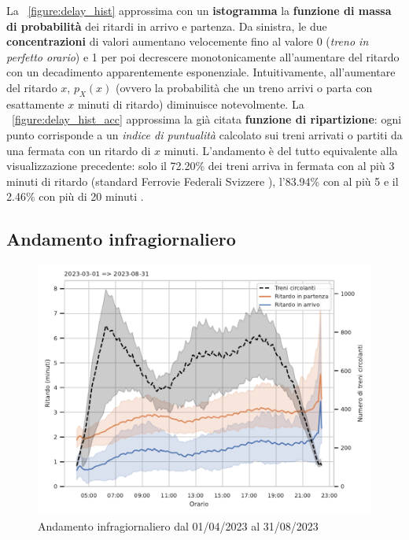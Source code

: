 \documentclass[12pt,a4paper,italian]{report}
\begin{document}
La \figurename~\ref{figure:delay_hist} approssima con un
\textbf{istogramma} la \textbf{funzione di massa di probabilità} dei
ritardi in arrivo e partenza.  Da sinistra, le due
\textbf{concentrazioni} di valori aumentano velocemente fino al valore
0 (\textit{treno in perfetto orario}) e 1 per poi decrescere
monotonicamente all'aumentare del ritardo con un decadimento
apparentemente esponenziale.  Intuitivamente, all'aumentare del
ritardo $x$, $p_X(x)$ (ovvero la probabilità che un treno arrivi o
parta con esattamente $x$ minuti di ritardo) diminuisce notevolmente.
La \figurename~\ref{figure:delay_hist_acc} approssima la già citata
\textbf{funzione di ripartizione}: ogni punto corrisponde a un
\textit{indice di puntualità} calcolato sui treni arrivati o partiti
da una fermata con un ritardo di $x$ minuti.  L'andamento è del tutto
equivalente alla visualizzazione precedente: solo il 72.20\% dei treni
arriva in fermata con al più 3 minuti di ritardo (standard Ferrovie
Federali Svizzere \cite{SbbPuntualita}), l'83.94\% con al più 5 e il
2.46\% con più di 20 minuti \cite[G]{StatJup}.

\subsection{Andamento infragiornaliero}
\label{andamento_infragiornaliero}

\begin{figure}[h]
    \includegraphics[width=1\textwidth]{images/intraday_delay.pdf}
    \caption{Andamento infragiornaliero dal 01/04/2023 al
        31/08/2023~}
    \label{figure:intraday_delay}
\end{figure}
\end{document}
